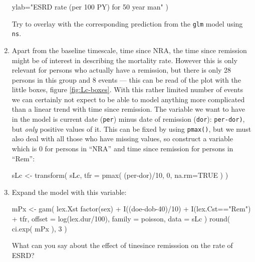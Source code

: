\begin{enumerate}[resume]
\begin{Schunk}
\begin{Sinput}
                   ylab="ESRD rate (per 100 PY) for 50 year man" )
\end{Sinput}
\end{Schunk}
Try to overlay with the corresponding prediction from the
\texttt{glm} model using \texttt{ns}. 
\item Apart from the baseline timescale, time since NRA, the time
  since remission might be of interest in describing the mortality
  rate.  However this is only relevant for persons who actually have a
  remission, but there is only 28 persons in this group and 8 events
  --- this can be read of the plot with the little boxes, figure
  \ref{fig:Lc-boxes}.
  With this rather limited number of events we can certainly not
  expect to be able to model anything more complicated than a linear
  trend with time since remission.
  The variable we want to have in the model is current date
  (\texttt{per}) minus date of remission (\texttt{dor}):
  \texttt{per-dor)}, but \emph{only} positive values of it. This
  can be fixed by using \texttt{pmax()}, but we must also deal with
  all those who have missing values, so construct a variable which is
  0 for persons in ``NRA'' and time since remission for persons in ``Rem'':
\begin{Schunk}
\begin{Sinput}
 sLc <- transform( sLc, tfr = pmax( (per-dor)/10, 0, na.rm=TRUE ) )
\end{Sinput}
\end{Schunk}
\item Expand the model with this variable:
\begin{Schunk}
\begin{Sinput}
 mPx <- gam( lex.Xst %in% EP ~ s( tfi, k=10 ) +
                    factor(sex) + I((doe-dob-40)/10) +  
                    I(lex.Cst=="Rem") + tfr,
             offset = log(lex.dur/100),
             family = poisson, 
               data = sLc )
 round( ci.exp( mPx ), 3 )
\end{Sinput}
\end{Schunk}
What can you say about the effect of tinesince remisssion on the rate
of ESRD?
\end{enumerate}
